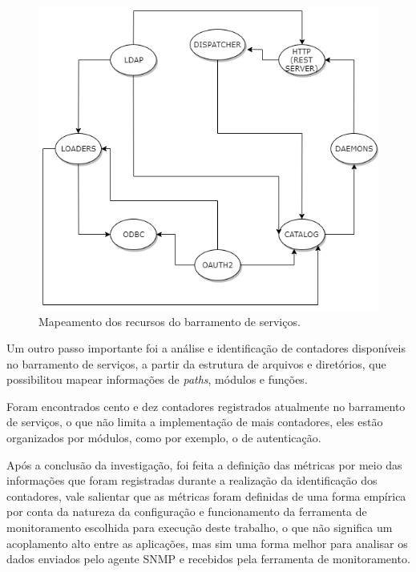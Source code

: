 \begin{figure}[h!]
	\begin{center}
	\includegraphics[scale = 0.70]{img/ResourcesEMS.png}
	\caption{Mapeamento dos recursos do barramento de serviços.}
	\label{fun:fig:ResourcesEMS}
	\end{center}
\end{figure}

Um outro passo importante foi a análise e identificação de contadores disponíveis no barramento de serviços, a partir da estrutura de arquivos e diretórios, que possibilitou mapear informações de \textit{paths}, módulos e funções. 

Foram encontrados cento e dez contadores registrados atualmente no barramento de serviços, o que não limita a implementação de mais contadores, eles estão organizados por módulos, como por exemplo, o de autenticação.  

Após a conclusão da investigação, foi feita a definição das métricas por meio das informações que foram registradas durante a realização da identificação dos contadores, vale salientar que as métricas foram definidas de uma forma empírica por conta da natureza da configuração e funcionamento da ferramenta de monitoramento escolhida para execução deste trabalho, o que não significa um acoplamento alto entre as aplicações, mas sim uma forma melhor para analisar os dados enviados pelo agente \acrshort{SNMP} e recebidos pela ferramenta de monitoramento. 

